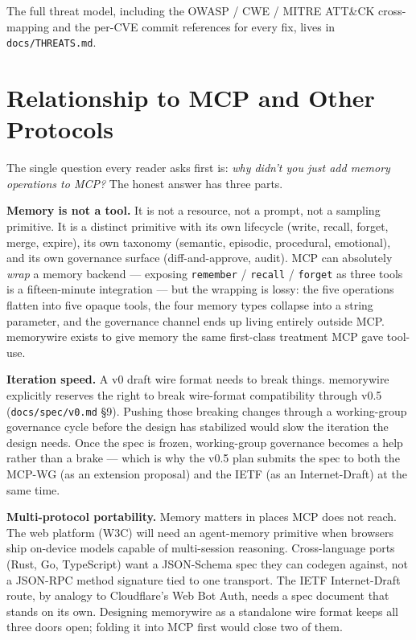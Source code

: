 \documentclass[11pt,letterpaper,twocolumn]{article}
\begin{document}
The full threat model, including the OWASP / CWE / MITRE ATT\&CK cross-mapping and the per-CVE commit references for every fix, lives in \texttt{docs/THREATS.md}.

\section{Relationship to MCP and Other Protocols}
\label{sec:mcp}

The single question every reader asks first is: \emph{why didn't you just add memory operations to MCP?} The honest answer has three parts.

\textbf{Memory is not a tool.} It is not a resource, not a prompt, not a sampling primitive. It is a distinct primitive with its own lifecycle (write, recall, forget, merge, expire), its own taxonomy (semantic, episodic, procedural, emotional), and its own governance surface (diff-and-approve, audit). MCP can absolutely \emph{wrap} a memory backend --- exposing \texttt{remember} / \texttt{recall} / \texttt{forget} as three tools is a fifteen-minute integration --- but the wrapping is lossy: the five operations flatten into five opaque tools, the four memory types collapse into a string parameter, and the governance channel ends up living entirely outside MCP. memorywire exists to give memory the same first-class treatment MCP gave tool-use.

\textbf{Iteration speed.} A v0 draft wire format needs to break things. memorywire explicitly reserves the right to break wire-format compatibility through v0.5 (\texttt{docs/spec/v0.md} \S9). Pushing those breaking changes through a working-group governance cycle before the design has stabilized would slow the iteration the design needs. Once the spec is frozen, working-group governance becomes a help rather than a brake --- which is why the v0.5 plan submits the spec to both the MCP-WG (as an extension proposal) and the IETF (as an Internet-Draft) at the same time.

\textbf{Multi-protocol portability.} Memory matters in places MCP does not reach. The web platform (W3C) will need an agent-memory primitive when browsers ship on-device models capable of multi-session reasoning. Cross-language ports (Rust, Go, TypeScript) want a JSON-Schema spec they can codegen against, not a JSON-RPC method signature tied to one transport. The IETF Internet-Draft route, by analogy to Cloudflare's Web Bot Auth, needs a spec document that stands on its own. Designing memorywire as a standalone wire format keeps all three doors open; folding it into MCP first would close two of them.
\end{document}
